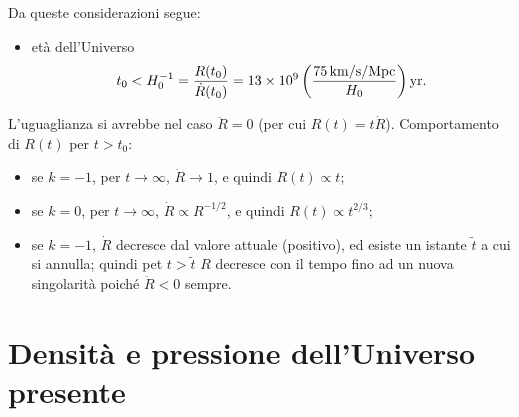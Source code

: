 Da queste considerazioni segue:
\begin{itemize}
\item età dell'Universo
  \begin{equation}
    t_0 < H_0^{-1}  = \frac {R(t_0)}{\dot{R}(t_0)} =  \num{13e9}
    \left(\frac{\SI{75}{\kilo\metre\per\second\per\mega\parsec}}{H_0}\right)
    \si{yr}.
  \end{equation}
\end{itemize}
L'uguaglianza si avrebbe nel caso $\ddot{R} =0$ (per cui $R(t)=t \dot{R}$).
Comportamento di $R(t)$ per $t>t_0$:
\begin{itemize}
\item se $k=-1$, per $t \to \infty$, $\dot{R} \to 1$, e quindi $R(t) \propto t$;
\item se $k=0$, per $t \to \infty$, $\dot{R} \propto R^{-1/2}$, e quindi
  $R(t) \propto t^{2/3}$;
\item se $k=-1$, $\dot{R}$ decresce dal valore attuale (positivo), ed esiste un
  istante $\tilde{t}$ a cui si annulla; quindi pet $t>\tilde{t}$ ${R}$ decresce
  con il tempo fino ad un nuova singolarità poiché $\ddot {R} <0$ sempre.
\end{itemize}

\section{Densità e pressione dell'Universo presente}

